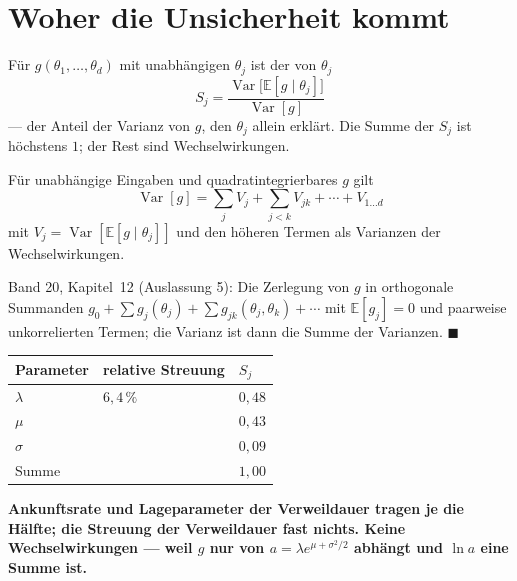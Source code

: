 \section{Woher die Unsicherheit kommt}

\begin{definition}
Für $g(\theta_1,\ldots,\theta_d)$ mit unabhängigen $\theta_j$ ist der  von $\theta_j$
\[ S_j = \frac{\operatorname{Var}\big[\mathbb E[g\mid\theta_j]\big]}{\operatorname{Var}[g]} \]
--- der Anteil der Varianz von $g$, den $\theta_j$ allein erklärt. Die Summe der $S_j$ ist höchstens $1$; der Rest sind Wechselwirkungen.
\end{definition}

\begin{merksatz}
Für unabhängige Eingaben und quadratintegrierbares $g$ gilt
\[ \operatorname{Var}[g] = \sum_j V_j + \sum_{j<k} V_{jk} + \cdots + V_{1\ldots d} \]
mit $V_j = \operatorname{Var}[\mathbb E[g\mid\theta_j]]$ und den höheren Termen als Varianzen der Wechselwirkungen.

Band 20, Kapitel~12 (Auslassung 5): Die Zerlegung von $g$ in orthogonale Summanden $g_0 + \sum g_j(\theta_j) + \sum g_{jk}(\theta_j,\theta_k)+\cdots$ mit $\mathbb E[g_j] = 0$ und paarweise unkorrelierten Termen; die Varianz ist dann die Summe der Varianzen. $\blacksquare$

\begin{center}
{\small
\renewcommand{\arraystretch}{1.48}
\begin{tabular}{@{}P{2.4cm}P{2.6cm}P{1.8cm}@{}}
\toprule
\textbf{Parameter} & \textbf{relative Streuung} & $S_j$\\
\midrule
$\lambda$ & $6{,}4\,\%$ & $0{,}48$\\
$\mu$ & & $0{,}43$\\
$\sigma$ & & $0{,}09$\\
\midrule
Summe & & $1{,}00$\\
\bottomrule
\end{tabular}}
\end{center}

\begin{center}
\begin{minipage}{0.9\textwidth}
\textbf{Ankunftsrate und Lageparameter der Verweildauer tragen je die Hälfte; die Streuung der Verweildauer fast nichts. Keine Wechselwirkungen --- weil $g$ nur von $a = \lambda e^{\mu+\sigma^2/2}$ abhängt und $\ln a$ eine Summe ist.}
\end{minipage}
\end{center}


\end{merksatz}

